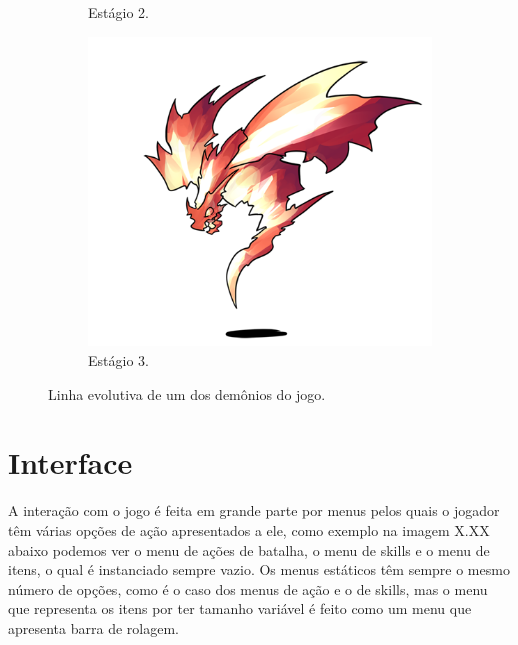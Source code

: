 \documentclass[
	12pt,				%
	openright,			%
	twoside,			%
	a4paper,			%
	english,			%
	french,				%
	spanish,			%
	brazil				%
	]{abntex2}
\begin{document}
\begin{figure}[h!]
\begin{subfigure}[b]{0.3\linewidth}
    \caption{Estágio 2.}
  \end{subfigure}
  \begin{subfigure}[b]{0.45\linewidth}
    \includegraphics[width=\linewidth]{stage3.png}
    \caption{Estágio 3.}
  \end{subfigure}
  \caption{Linha evolutiva de um dos demônios do jogo.}
  \label{fig:evolution}
\end{figure}

\section{Interface}

A interação com o jogo é feita em grande parte por menus pelos quais o jogador têm várias opções de ação apresentados a ele, como exemplo na imagem X.XX abaixo podemos ver o menu de ações de batalha, o menu de skills e o menu de itens, o qual é instanciado sempre vazio. Os menus estáticos têm sempre o mesmo número de opções, como é o caso dos menus de ação e o de skills, mas o menu que representa os itens por ter tamanho variável é feito como um menu que apresenta barra de rolagem.
\end{document}
